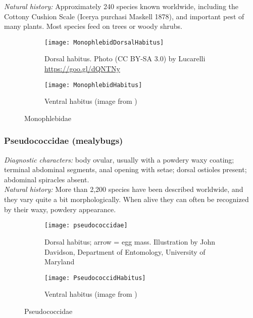\noindent{}\textit{Natural history:} Approximately 240 species known worldwide, including the Cottony Cushion Scale (Icerya purchasi Maskell 1878), and important pest of many plants. Most species feed on trees or woody shrubs.\\

\begin{figure}[ht!]
 \centering
 \begin{subfigure}[ht!]{0.42\textwidth}
  \texttt{[image: MonophlebidDorsalHabitus]}
  \caption{Dorsal habitus. Photo (CC BY-SA 3.0) by Lucarelli \url{https://goo.gl/dQNTNy}}
  \label{fig:monophlebid1}
 \end{subfigure}
 \qquad
 \begin{subfigure}[ht!]{0.45\textwidth}
  \texttt{[image: MonophlebidHabitus]}
  \caption{Ventral habitus (image from \cite{ScaleNet})}
  \label{fig:monophlebid2}
 \end{subfigure}
 \caption{Monophlebidae}\label{fig:monophlebids}
\end{figure}


\subsubsection{Pseudococcidae (mealybugs)}
\noindent{}\textit{Diagnostic characters:} body ovular, usually with a powdery waxy coating; terminal abdominal segments, anal opening with setae; dorsal ostioles present; abdominal spiracles absent.\\

\noindent{}\textit{Natural history:} More than 2,200 species have been described worldwide, and they vary quite a bit morphologically. When alive they can often be recognized by their waxy, powdery appearance.\\

\begin{figure}[ht!]
 \centering
 \begin{subfigure}[ht!]{0.38\textwidth}
  \texttt{[image: pseudococcidae]}
  \caption{Dorsal habitus; arrow = egg mass. Illustration by John Davidson, Department of Entomology, University of Maryland}
  \label{fig:pseudococcid1}
 \end{subfigure}
 \qquad
 \begin{subfigure}[ht!]{0.45\textwidth}
  \texttt{[image: PseudococcidHabitus]}
  \caption{Ventral habitus (image from \cite{ScaleNet})}
  \label{fig:pseudococcid2}
 \end{subfigure}
 \caption{Pseudococcidae}\label{fig:pseudococcid}
\end{figure}


